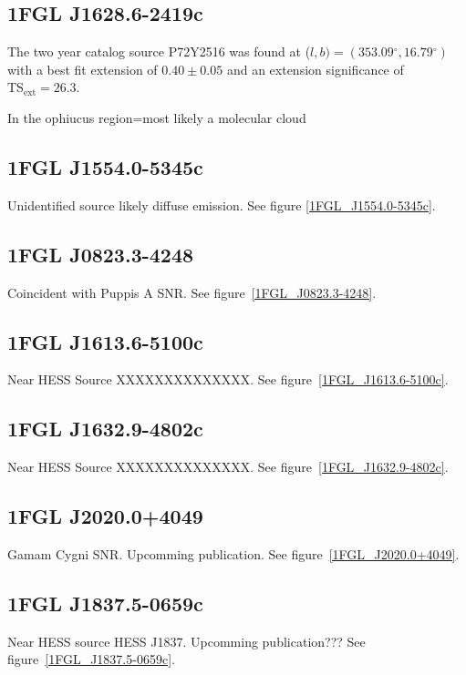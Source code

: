 \documentclass[preprint]{aastex}
\newcommand{\tsext}{{\ensuremath{\text{TS}_\text{ext}}}\xspace}
\renewcommand{\deg}{\ensuremath{^\circ}\xspace}
\begin{document}
\subsection{1FGL J1628.6-2419c}

The two year catalog source P72Y2516 was found at ($l,b)=(353.09\deg, 16.79\deg)$
with a best fit extension of $0.40\pm0.05$ and an extension significance of
$\tsext=26.3$.

In the ophiucus region=most likely a molecular cloud

\subsection{1FGL J1554.0-5345c}
Unidentified source likely diffuse emission.
See figure \ref{1FGL_J1554.0-5345c}.

\subsection{1FGL J0823.3-4248}
Coincident with Puppis A SNR.
See figure~\ref{1FGL_J0823.3-4248}.

\subsection{1FGL J1613.6-5100c}
Near HESS Source XXXXXXXXXXXXXX.
See figure~\ref{1FGL_J1613.6-5100c}.

\subsection{1FGL J1632.9-4802c}
Near HESS Source XXXXXXXXXXXXXX.
See figure~\ref{1FGL_J1632.9-4802c}.


\subsection{1FGL J2020.0+4049}
Gamam Cygni SNR. Upcomming publication. 
See figure~\ref{1FGL_J2020.0+4049}.

\subsection{1FGL J1837.5-0659c}
Near HESS source HESS J1837. Upcomming publication???
See figure~\ref{1FGL_J1837.5-0659c}.
\end{document}
